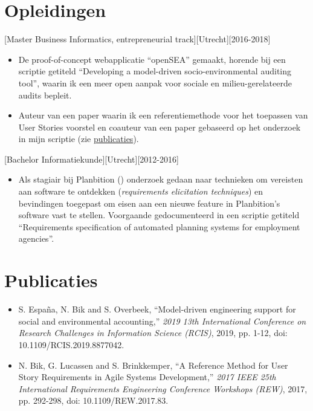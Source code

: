 \documentclass[10pt]{article}
\begin{document}
\section{Opleidingen}
\label{sec:school}

[Master Business Informatics,
      entrepreneurial track][Utrecht][2016-2018]
\begin{itemize}
      \item De proof-of-concept webapplicatie \enquote{openSEA} gemaakt, horende bij
            een scriptie getiteld \enquote{Developing a model-driven socio-environmental
                  auditing tool}, waarin ik een meer open aanpak voor sociale en
            milieu-gerelateerde audits bepleit.
      \item Auteur van een paper waarin ik een referentiemethode voor het toepassen
            van User Stories voorstel en coauteur van een paper gebaseerd op het onderzoek
            in mijn scriptie (zie \hyperref[sec:pubs]{publicaties}).
\end{itemize}

[Bachelor
      Informatiekunde][Utrecht][2012-2016]
\begin{itemize}
      \item Als stagiair bij Planbition () onderzoek gedaan
            naar technieken om vereisten aan software te ontdekken (\textit{requirements
                  elicitation techniques}) en bevindingen toegepast om eisen aan een nieuwe
            feature in Planbition's software vast te stellen. Voorgaande gedocumenteerd in
            een scriptie getiteld \enquote{Requirements specification of automated planning
                  systems for employment agencies}.
\end{itemize}

\section{Publicaties}
\label{sec:pubs}

\begin{itemize}
      \item S. España, N. Bik and S. Overbeek, \enquote{Model-driven engineering
                  support for social and environmental accounting,} \textit{2019 13th
                  International Conference on Research Challenges in Information Science (RCIS)},
            2019, pp. 1-12, doi:\\ 10.1109/RCIS.2019.8877042.
      \item N. Bik, G. Lucassen and S. Brinkkemper, \enquote{A Reference Method for
                  User Story Requirements in Agile Systems Development,} \textit{2017 IEEE 25th
                  International Requirements Engineering Conference Workshops (REW)}, 2017, pp.
            292-298, doi: 10.1109/REW.2017.83.
\end{itemize}
\end{document}
